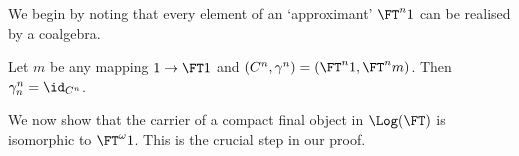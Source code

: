 \documentclass{entcs}
\begin{document}

We begin by noting that every element of an `approximant' $\FT^n 1$ can be
realised by a coalgebra.

\begin{prop} \label{lemma:gamma-n-n}
  Let $m$ be any mapping $1 \to \FT 1$ and $(C^n, \gamma^n) = (\FT^n 1, \FT^n
  m)$. Then $\gamma_n^n = \id_{C^n}$.
\end{prop}

\noindent
We now show that the carrier of a compact final object in $\Log(\FT)$ is
isomorphic to $\FT^{\omega} 1$. %
This is the crucial step in our proof.
\end{document}

